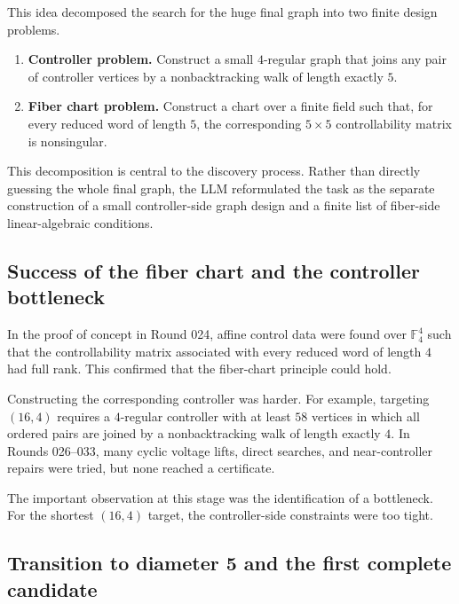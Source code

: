 \documentclass[11pt]{article}
\theoremstyle{definition}
\theoremstyle{remark}
\providecommand{\tightlist}{\setlength{\itemsep}{0pt}\setlength{\parskip}{0pt}}
\renewcommand{\_}{\textunderscore\allowbreak}
\begin{document}
This idea decomposed the search for the huge final graph into two finite
design problems.

\begin{enumerate}
\def\labelenumi{\arabic{enumi}.}
\tightlist
\item
  \textbf{Controller problem.} Construct a small \(4\)-regular graph
  that joins any pair of controller vertices by a nonbacktracking walk
  of length exactly \(5\).
\item
  \textbf{Fiber chart problem.} Construct a chart over a finite field
  such that, for every reduced word of length \(5\), the corresponding
  \(5\times 5\) controllability matrix is nonsingular.
\end{enumerate}

This decomposition is central to the discovery process. Rather than
directly guessing the whole final graph, the LLM reformulated the task
as the separate construction of a small controller-side graph design and
a finite list of fiber-side linear-algebraic conditions.

\subsection{Success of the fiber chart and the controller
bottleneck}\label{success-of-the-fiber-chart-and-the-controller-bottleneck}

In the proof of concept in Round 024, affine control data were found
over \(\mathbb F_4^4\) such that the controllability matrix associated
with every reduced word of length \(4\) had full rank. This confirmed
that the fiber-chart principle could hold.

Constructing the corresponding controller was harder. For example,
targeting \((16,4)\) requires a \(4\)-regular controller with at least
\(58\) vertices in which all ordered pairs are joined by a
nonbacktracking walk of length exactly \(4\). In Rounds 026--033, many
cyclic voltage lifts, direct searches, and near-controller repairs were
tried, but none reached a certificate.

The important observation at this stage was the identification of a
bottleneck. For the shortest \((16,4)\) target, the controller-side
constraints were too tight.

\subsection{Transition to diameter 5 and the first complete
candidate}\label{transition-to-diameter-5-and-the-first-complete-candidate}
\end{document}
